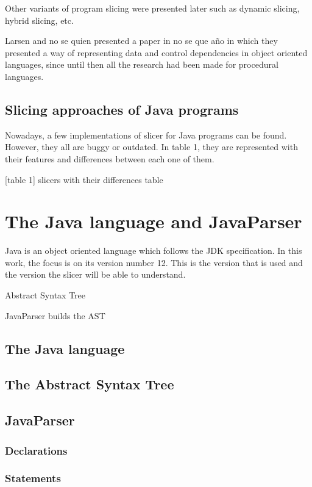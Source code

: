 \documentclass[a4paper]{article}
\begin{document}
Other variants of program slicing were presented later such as dynamic slicing, hybrid slicing, etc. 

Larsen and no se quien presented a paper in no se que año in which they presented a way of representing data and control dependencies in object oriented languages, since until then all the research had been made for procedural languages. 

\subsection{Slicing approaches of Java programs}

Nowadays, a few implementations of slicer for Java programs can be found. However, they all are buggy or outdated. In table 1, they are represented with their features and differences between each one of them.

[table 1]
slicers with their differences table

\section{The Java language and JavaParser}

Java is an object oriented language which follows the JDK specification. In this work, the focus is on its version number 12. This is the version that is used and the version the slicer will be able to understand.

Abstract Syntax Tree

JavaParser builds the AST 

\subsection{The Java language}

\subsection{The Abstract Syntax Tree}

\subsection{JavaParser}

\subsubsection{Declarations}

\subsubsection{Statements}
\end{document}
